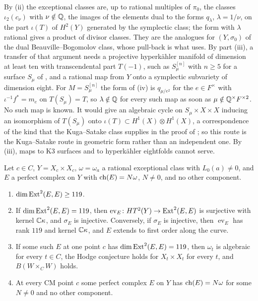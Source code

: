 \begin{remark}\label{rem:hkroute}
By (ii) the exceptional classes are, up to rational
multiples of $\pi_{0}$, the classes $\iota_{2}(c_{\nu})$ with $\nu\notin\mathbb{Q}$,
the images of the elements dual to the forms $q_{\lambda}$, $\lambda=1/\nu$,
on the part $\iota(T)$ of $H^{2}(Y)$ generated by the symplectic class; the
form with $\lambda$ rational gives a product of divisor classes. They are the
analogues for $(Y,\sigma_{0})$ of the dual Beauville--Bogomolov class, whose
pull-back is what \cite{vGR26} uses. By part (iii), a transfer of that
argument needs a projective hyperk\"ahler manifold of dimension at least ten with
transcendental part $T(-1)$, such as $S_{\mu}^{[n]}$ with $n\ge5$ for a
surface $S_{\mu}$ of , and a rational map from $Y$ onto a
symplectic subvariety of dimension eight. For $M=S_{\mu}^{[n]}$ the form of
(iv) is $q_{\mu/e^{2}}$ for the $e\in F^{\times}$ with $\iota^{-1}f^{*}=m_{e}$
on $T(S_{\mu})=T$, so $\lambda\notin\mathbb{Q}$ for every such map as soon as
$\mu\notin\mathbb{Q}^{\times}F^{\times2}$. No such map is known. It would give an
algebraic cycle on $S_{\mu}\times X\times X$ inducing an isomorphism of
$T(S_{\mu})$ onto $\iota(T)\subset H^{1}(X)\otimes H^{1}(X)$, a correspondence
of the kind that the Kuga--Satake class supplies in the proof of
; so this route is the Kuga--Satake route in geometric
form rather than an independent one. By (iii), maps to K3 surfaces and to
hyperk\"ahler eightfolds cannot serve.
\end{remark}

\begin{theorem}
\label{thm:mumfordnumerical}
Let $c\in C$, $Y=X_{c}\times X_{c}$, $\omega=\omega_{a}$ a rational
exceptional class with $L_{0}(a)\ne0$, and $E$ a perfect complex on $Y$ with
$\operatorname{ch}(E)=N\omega$, $N\ne0$, and no other component.
\begin{enumerate}[label=\textup{(\roman*)},leftmargin=2.6em,itemsep=2pt]
\item $\dim\operatorname{Ext}^{2}(E,E)\ge119$.
\item If $\dim\operatorname{Ext}^{2}(E,E)=119$, then $\operatorname{ev}_{E}\colon
  HT^{2}(Y)\to\operatorname{Ext}^{2}(E,E)$ is surjective with kernel $\mathbb{C}\kappa$, and
  $\sigma_{E}$ is injective. Conversely, if $\sigma_{E}$ is injective, then
  $\operatorname{ev}_{E}$ has rank $119$ and kernel $\mathbb{C}\kappa$, and $E$
  extends to first order along the curve.
\item If some such $E$ at one point $c$ has $\dim\operatorname{Ext}^{2}(E,E)=119$, then
  $\omega_{t}$ is algebraic for every $t\in C$, the Hodge conjecture holds for
  $X_{t}\times X_{t}$ for every $t$, and $B(W\times_{C}W)$ holds.
\item At every CM point $c$ some perfect complex $E$ on $Y$ has
  $\operatorname{ch}(E)=N\omega$ for some $N\ne0$ and no other component.
\end{enumerate}
\end{theorem}

